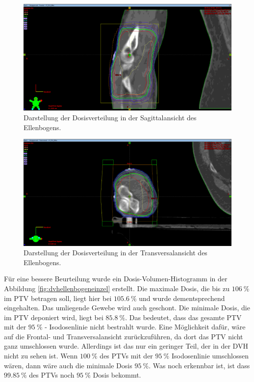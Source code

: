 \begin{figure}[htpb]
	\centering
	\includegraphics[width=0.7\linewidth]{../Bilder/EllenbogenY}
	\caption{Darstellung der Dosisverteilung in der Sagittalansicht des Ellenbogens.}
	\label{fig:ellenbogeny}
\end{figure}

\begin{figure}[htpb]
	\centering
	\includegraphics[width=0.7\linewidth]{../Bilder/EllenbogenZ}
	\caption{Darstellung der Dosisverteilung in der Transversalansicht des Ellenbogens.}
	\label{fig:ellenbogenz}
\end{figure}

Für eine bessere Beurteilung wurde ein Dosis-Volumen-Histogramm in der Abbildung \ref{fig:dvhellenbogeneinzel} erstellt. Die maximale Dosis, die bis zu $\SI{106}{\percent}$ im PTV betragen soll, liegt hier bei $\SI{105,6}{\percent}$ und wurde dementsprechend eingehalten. Das umliegende Gewebe wird auch geschont. Die minimale Dosis, die im PTV deponiert wird, liegt bei $\SI{85,8}{\percent}$. 
Das bedeutet, dass das gesamte PTV mit der $\SI{95}{\percent}$ - Isodosenlinie nicht bestrahlt wurde. Eine Möglichkeit dafür, wäre auf die Frontal- und Transversalansicht zurückzuführen, da dort das PTV nicht ganz umschlossen wurde. Allerdings ist das nur ein geringer Teil, der in der DVH nicht zu sehen ist. Wenn $\SI{100}{\percent}$ des PTVs mit der $\SI{95}{\percent}$ Isodosenlinie umschlossen wären, dann wäre auch die minimale Dosis $\SI{95}{\percent}$. Was noch erkennbar ist, ist dass $\SI{99,85}{\percent}$ des PTVs noch $\SI{95}{\percent}$ Dosis bekommt.

